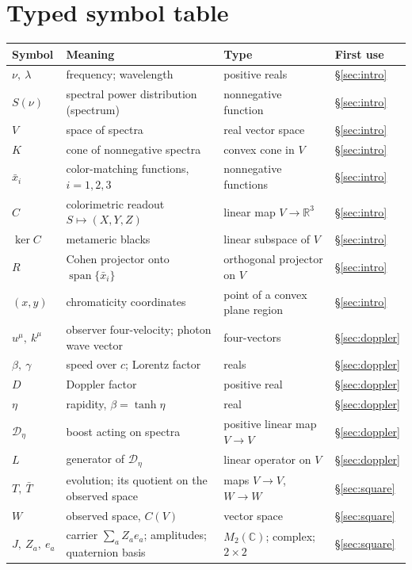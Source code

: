 \documentclass[11pt]{article}
\theoremstyle{boldplain}
\theoremstyle{boldupright}
\newcommand{\Dop}{\mathcal{D}}
\begin{document}
\section*{Typed symbol table}

{\small
\begin{longtable}{@{}l p{2.7in} p{2.0in} l@{}}
\toprule
Symbol & Meaning & Type & First use\\
\midrule
\endhead
\bottomrule
\endfoot
$\nu,\ \lambda$ & frequency; wavelength & positive reals & \S\ref{sec:intro}\\
$S(\nu)$ & spectral power distribution (spectrum) & nonnegative function & \S\ref{sec:intro}\\
$V$ & space of spectra & real vector space & \S\ref{sec:intro}\\
$K$ & cone of nonnegative spectra & convex cone in $V$ & \S\ref{sec:intro}\\
$\bar x_i$ & color-matching functions, $i=1,2,3$ & nonnegative functions & \S\ref{sec:intro}\\
$C$ & colorimetric readout $S\mapsto(X,Y,Z)$ & linear map $V\to\mathbb{R}^3$ & \S\ref{sec:intro}\\
$\ker C$ & metameric blacks & linear subspace of $V$ & \S\ref{sec:intro}\\
$R$ & Cohen projector onto $\operatorname{span}\{\bar x_i\}$ & orthogonal projector on $V$ & \S\ref{sec:intro}\\
$(x,y)$ & chromaticity coordinates & point of a convex plane region & \S\ref{sec:intro}\\
$u^\mu,\ k^\mu$ & observer four-velocity; photon wave vector & four-vectors & \S\ref{sec:doppler}\\
$\beta,\ \gamma$ & speed over $c$; Lorentz factor & reals & \S\ref{sec:doppler}\\
$D$ & Doppler factor & positive real & \S\ref{sec:doppler}\\
$\eta$ & rapidity, $\beta=\tanh\eta$ & real & \S\ref{sec:doppler}\\
$\Dop_\eta$ & boost acting on spectra & positive linear map $V\to V$ & \S\ref{sec:doppler}\\
$L$ & generator of $\Dop_\eta$ & linear operator on $V$ & \S\ref{sec:doppler}\\
$T,\ \bar T$ & evolution; its quotient on the observed space & maps $V\to V$, $W\to W$ & \S\ref{sec:square}\\
$W$ & observed space, $C(V)$ & vector space & \S\ref{sec:square}\\
$J,\ Z_a,\ e_a$ & carrier $\sum_a Z_a e_a$; amplitudes; quaternion basis & $M_2(\mathbb{C})$; complex; $2\times2$ & \S\ref{sec:square}\\

\end{longtable}}
\end{document}
